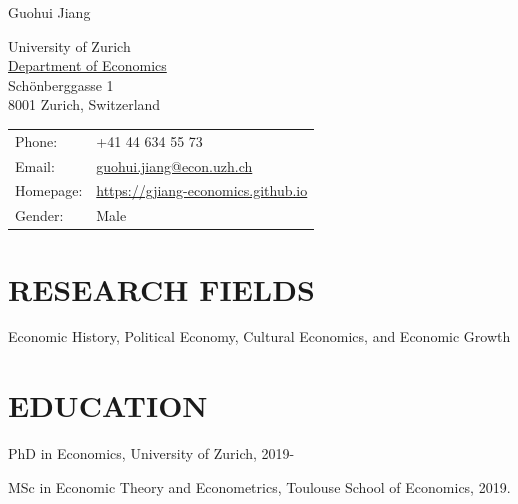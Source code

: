 \documentclass[letterpaper]{article}
\def\name{Guohui Jiang}
\renewenvironment{itemize}{
  \begin{list}{}{
    \setlength{\leftmargin}{1.5em}
  }
}{
  \end{list}
}
\begin{document}

{\huge \name}

\vspace{0.25in}

\begin{minipage}{0.45\linewidth}
  University of Zurich \\
  \href{https://www.econ.uzh.ch/en.html}{Department of Economics} \\
  Schönberggasse 1 \\
  8001 Zurich, Switzerland
\end{minipage}
\begin{minipage}{0.45\linewidth}
  \begin{tabular}{ll}
    Phone: & +41 44 634 55 73 \\
    Email: & \href{mailto:guohui.jiang@econ.uzh.ch}{guohui.jiang@econ.uzh.ch} \\
    Homepage: & \href{https://gjiang-economics.github.io}{https://gjiang-economics.github.io} \\
    Gender: & Male
  \end{tabular}
\end{minipage}

\section*{\MakeUppercase{Research Fields}}
\begin{itemize}
	\item Economic History, Political Economy, Cultural Economics, and Economic Growth
\end{itemize}

\section*{\MakeUppercase{education}}
\begin{itemize}
  \item PhD in Economics, University of Zurich, 2019-
  \item MSc in Economic Theory and Econometrics, Toulouse School of Economics, 2019.

\end{itemize}
\end{document}

